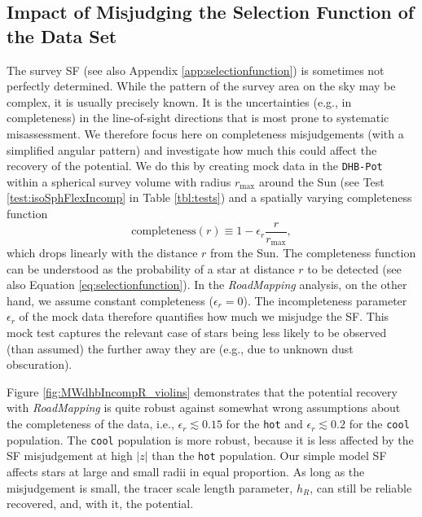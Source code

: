 \documentclass[iop,revtex4,numberedappendix,appendixfloats]{emulateapj}
\newcommand{\RM}{{\sl RoadMapping}}
\begin{document}
\subsection{Impact of Misjudging the Selection Function of the Data Set} \label{sec:results_incompR}

The survey SF (see also Appendix \ref{app:selectionfunction}) is sometimes not perfectly determined. While the pattern of the survey area on the sky may be complex, it is usually precisely known. It is the uncertainties (e.g., in completeness) in the line-of-sight directions that is most prone to systematic misassessment. We therefore focus here on completeness misjudgements (with a simplified angular pattern) and investigate how much this could affect the recovery of the potential. We do this by creating mock data in the \texttt{DHB-Pot} within a spherical survey volume with radius $r_\text{max}$ around the Sun (see Test \ref{test:isoSphFlexIncomp} in Table \ref{tbl:tests}) and a spatially varying completeness function
\begin{equation}
\text{completeness}(r) \equiv 1- \epsilon_r \frac{r}{r_\text{max}}, \label{eq:rad_incomp}
\end{equation}
which drops linearly with the distance $r$ from the Sun. The completeness function can be understood as the probability of a star at distance $r$ to be detected (see also Equation \ref{eq:selectionfunction}). In the \RM{} analysis, on the other hand, we assume constant completeness ($\epsilon_r=0$). The incompleteness parameter $\epsilon_r$ of the mock data therefore quantifies how much we misjudge the SF. This mock test captures the relevant case of stars being less likely to be observed (than assumed) the further away they are (e.g., due to unknown dust obscuration). 

Figure \ref{fig:MWdhbIncompR_violins} demonstrates that the potential recovery with \RM{} is quite robust against somewhat wrong assumptions about the completeness of the data, i.e., $\epsilon_r \lesssim 0.15$ for the \texttt{hot} and $\epsilon_r \lesssim 0.2$ for the \texttt{cool} population. The \texttt{cool} population is more robust, because it is less affected by the SF misjudgement at high $|z|$ than the \texttt{hot} population. Our simple model SF affects stars at large and small radii in equal proportion. As long as the misjudgement is small, the tracer scale length parameter, $h_R$, can still be reliable recovered, and, with it, the potential.
\end{document}
